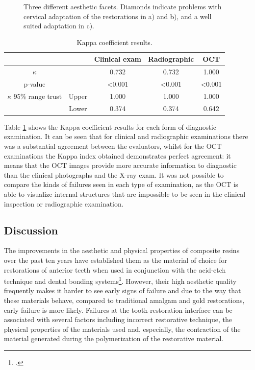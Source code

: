 \documentclass[12pt,twoside,english]{book}
\renewcommand{\~}{\perispomeni}%
\providecommand{\tabularnewline}{\\}
\numberwithin{equation}{section}
\numberwithin{figure}{section}
\begin{document}
\begin{figure}[h]
\centering

\caption{Three different aesthetic facets. Diamonds indicate problems with cervical adaptation of the restorations in a) and b), and a well suited adaptation in c).} 
\label{fig:9}
\end{figure}
\begin{table}
\noindent \centering{}\begin{tabular}{ccccc}
\hline 
 & & Clinical exam & Radiographic & OCT\tabularnewline
\hline
\hline 
$\kappa$ & & 0.732 & 0.732 & 1.000\tabularnewline
p-value & & <0.001 & <0.001 & <0.001\tabularnewline
$\kappa$ 95\% range trust & Upper & 1.000 & 1.000 & 1.000\tabularnewline
 & Lower & 0.374 & 0.374 & 0.642\tabularnewline
\hline
\end{tabular}\caption{Kappa coefficient results.\label{table:kappa results}}
\end{table}

Table \ref{table:kappa results} shows the Kappa coefficient results for each form of diagnostic examination. It can be seen that for clinical and radiographic examinations there was a substantial agreement between the evaluators, whilst for the OCT examinations the Kappa index obtained demonstrates perfect agreement: it means that the OCT images provide more accurate information to diagnostic than the clinical photographs and the X-ray exam. It was not possible to compare the kinds of failures seen in each type of examination, as the OCT is able to visualize internal structures that are impossible to be seen in the clinical inspection or radiographic examination.

\subsection{Discussion}

The improvements in the aesthetic and physical properties of composite resins over the past ten years have established them as the material of choice for restorations of anterior teeth when used in conjunction with the acid-etch technique and dental bonding systems\footcite{Garoushi:2007p2191}. However, their high aesthetic quality frequently makes it harder to see early signs of failure and due to the way that these materials behave, compared to traditional amalgam and gold restorations, early failure is more likely. Failures at the tooth-restoration interface can be associated with several factors including incorrect restorative technique, the physical properties of the materials used and, especially, the contraction of the material generated during the polymerization of the restorative material.
\end{document}
